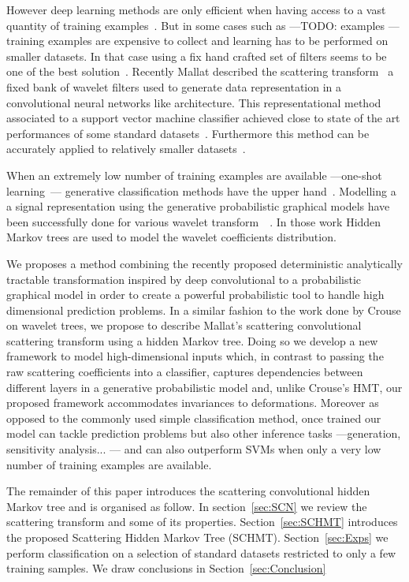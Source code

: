 \documentclass{article}
\begin{document}
	However deep learning methods are only efficient when having access to a vast quantity of training examples~\cite{glorot2010understanding}. But in some cases such as ---TODO: examples --- training examples are expensive to collect and learning has to be performed on smaller datasets. In that case using a fix hand crafted set of filters seems to be one of the best solution~\cite{hsiang2001embedded}. Recently Mallat described the scattering transform~\cite{mallat2012gis} a fixed bank of wavelet filters used to generate data representation in a convolutional neural networks like architecture. This representational method associated to a support vector machine classifier achieved close to state of the art performances of some standard datasets~\cite{bruna2010classification}. Furthermore this method can be accurately applied to relatively smaller datasets~\cite{sifre2013rotation}.
	
	When an extremely low number of training examples are available ---one-shot learning~\cite{fei2006one}--- generative classification methods have the upper hand~\cite{jordan2002discriminative}. Modelling a a signal representation using the generative probabilistic graphical models have been successfully done for various wavelet transform~\cite{crouse1998wavelet}~\cite{kingsbury2001complex}. In those work Hidden Markov trees are used to model the wavelet coefficients distribution.

    
	We proposes a method combining the recently proposed deterministic analytically tractable transformation inspired by deep convolutional to a probabilistic graphical model in order to create a powerful probabilistic tool to handle high dimensional prediction problems. In a similar fashion to the work done by Crouse on wavelet trees, we propose to describe Mallat's scattering convolutional scattering transform using a hidden Markov tree. Doing so we develop a new framework to model high-dimensional inputs which, in contrast to passing the raw scattering coefficients into a classifier, captures dependencies between different layers in a generative probabilistic model and, unlike Crouse's HMT, our proposed framework accommodates invariances to deformations. Moreover as opposed to the commonly used simple classification method, once trained our model can tackle prediction problems but also other inference tasks ---\eg generation, sensitivity analysis... --- and can also outperform SVMs when only a very low number of training examples are available.

  The remainder of this paper introduces the scattering convolutional hidden Markov tree and is organised as follow. In section~\ref{sec:SCN} we review the scattering transform and some of its properties. Section~\ref{sec:SCHMT} introduces the proposed Scattering Hidden Markov Tree (SCHMT). Section~\ref{sec:Exps} we perform classification on a selection of standard datasets restricted to only a few training samples. We draw conclusions in Section~\ref{sec:Conclusion}
\end{document}
